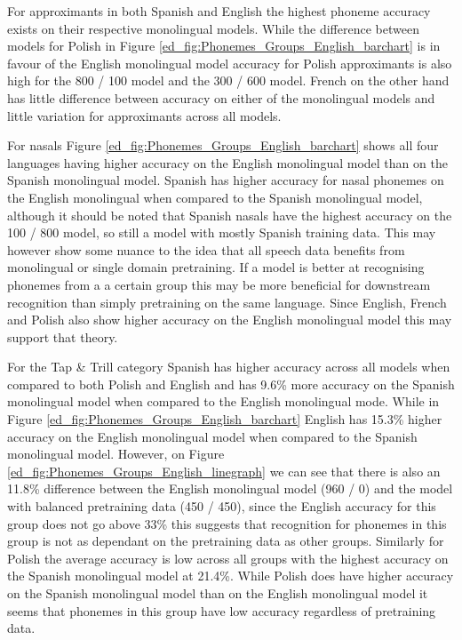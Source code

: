\begin{table}
For approximants in both Spanish and English the highest phoneme accuracy exists on their respective monolingual models. While the difference between models for Polish in Figure \ref{ed_fig:Phonemes_Groups_English_barchart} is in favour of the English monolingual model accuracy for Polish approximants is also high for the 800 / 100 model and the 300 / 600 model. French on the other hand has little difference between accuracy on either of the monolingual models and little variation for approximants across all models.

For nasals Figure \ref{ed_fig:Phonemes_Groups_English_barchart} shows all four languages having higher accuracy on the English monolingual model than on the Spanish monolingual model. Spanish has higher accuracy for nasal phonemes on the English monolingual when compared to the Spanish monolingual model, although it should be noted that Spanish nasals have the highest accuracy on the 100 / 800 model, so still a model with mostly Spanish training data. This may however show some nuance to the idea that all speech data benefits from monolingual or single domain pretraining. If a model is better at recognising phonemes from a a certain group this may be more beneficial for downstream recognition than simply pretraining on the same language. Since English, French and Polish also show higher accuracy on the English monolingual model this may support that theory. 

For the Tap \& Trill category Spanish has higher accuracy across all models when compared to both Polish and English and has 9.6\% more accuracy on the Spanish monolingual model when compared to the English monolingual mode. While in Figure  \ref{ed_fig:Phonemes_Groups_English_barchart} English has 15.3\% higher accuracy on the English monolingual model when compared to the Spanish monolingual model. However, on Figure \ref{ed_fig:Phonemes_Groups_English_linegraph} we can see that there is also an 11.8\% difference between the English monolingual model (960 / 0) and the model with balanced pretraining data (450 / 450), since the English accuracy for this group does not go above 33\% this suggests that recognition for phonemes in this group is not as dependant on the pretraining data as other groups. Similarly for Polish the average accuracy is low across all groups with the highest accuracy on the Spanish monolingual model at 21.4\%. While Polish does have higher accuracy on the Spanish monolingual model than on the English monolingual model it seems that phonemes in this group have low accuracy regardless of pretraining data. %


\end{table}
